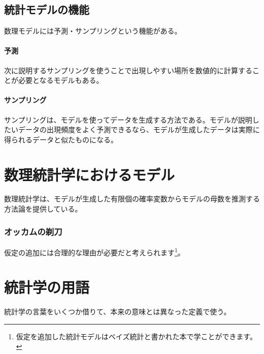 
\begin{brokenbox}[colback=yellow]
    \blindtext[5]
  \end{brokenbox}
\fi 

\clearpage
\clearpage
\subsection{統計モデルの機能}
数理モデルには予測・サンプリングという機能がある。%
\paragraph{予測}

次に説明するサンプリングを使うことで出現しやすい場所を数値的に計算することが必要となるモデルもある。

\paragraph{サンプリング}
サンプリングは、モデルを使ってデータを生成する方法である。モデルが説明したいデータの出現頻度をよく予測できるなら、モデルが生成したデータは実際に得られるデータと似たものになる。




\section{数理統計学におけるモデル}
数理統計学は、モデルが生成した有限個の確率変数からモデルの母数を推測する方法論を提供している。

\subsubsection{オッカムの剃刀}

仮定の追加には合理的な理由が必要だと考えられます\footnote{仮定を追加した統計モデルはベイズ統計と書かれた本で学ことができます。}。

\begin{figure}
    \begin{center}
%
\end{center}
\end{figure}
\fi


\section{統計学の用語}
統計学の言葉をいくつか借りて、本来の意味とは異なった定義で使う。


